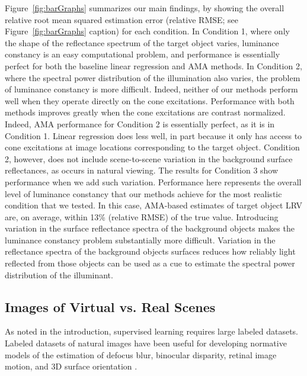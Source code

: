 \documentclass{jov}
\begin{document}
Figure~\ref{fig:barGraphs} summarizes our main findings, by showing the overall relative root mean squared estimation error (relative RMSE; see Figure~\ref{fig:barGraphs} caption) for each condition. 
In Condition 1, where only the shape of the reflectance spectrum of the target object varies, 
luminance constancy is an easy computational problem,
and performance is essentially perfect for both the baseline linear regression and AMA methods.
In Condition 2, where the spectral power distribution of the illumination also varies, the problem of luminance constancy is more difficult.
Indeed, neither of our methods perform well when they operate directly on the cone excitations.
Performance with both methods improves greatly when the cone excitations are contrast normalized. 
Indeed, AMA performance for Condition 2 is essentially perfect, as it is in Condition 1.
Linear regression does less well, in part because it only has access to cone excitations at image locations
corresponding to the target object.
Condition 2, however, does not include scene-to-scene variation in the background surface reflectances,
as occurs in natural viewing.
The results for Condition 3 show performance when we add such variation.
Performance here represents the overall level of luminance constancy that our methods achieve for the
most realistic condition that we tested.
In this case, AMA-based estimates of target object LRV are, on average, within 13\% (relative RMSE) of the true value.
Introducing variation in the surface reflectance spectra of the background objects makes 
the luminance constancy problem substantially more difficult. 
Variation in the reflectance spectra of the background objects surfaces reduces how 
reliably light reflected from those objects can be used as a cue to estimate the spectral power distribution of the illuminant.

\subsection{Images of Virtual vs. Real Scenes}
As noted in the introduction, supervised learning requires large labeled datasets. Labeled datasets of natural images have been useful for developing normative models of the estimation of defocus blur, binocular disparity, retinal image motion, and 3D surface orientation \cite{burge2011optimal, burge2012optimal, burge2014optimal, burge2015optimal, kim2018lawful, burge2010natural, girshick2011cardinal, burge2016estimating, goncalves2017not}. 
\end{document}
